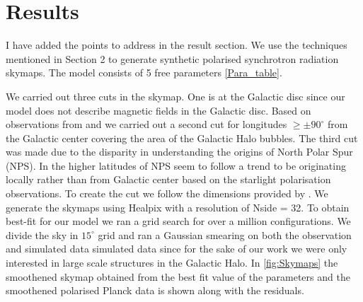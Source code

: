 \documentclass[12pt, a4 paper]{article}
\newcommand{\Vasu}[1]{{\color{purple}#1}}
\begin{document}
\clearpage
\newpage
\section{Results}

\Vasu{I have added the points to address in the result section.}
We use the techniques mentioned in Section 2 to generate synthetic polarised synchrotron radiation skymaps. The model consists of 5 free parameters \ref{Para_table}. 

We carried out three cuts in the skymap. One is at the Galactic disc since our model does not describe magnetic fields in the Galactic disc. Based on observations from \cite{eROSITA} and \cite{Su_2010} we carried out a second cut for longitudes  $\geq \pm 90^{\circ}$ from the Galactic center covering the area of the Galactic Halo bubbles.
The third cut was made due to the disparity in understanding the origins of North Polar Spur (NPS). In \cite{Gina_2021} the higher latitudes of NPS seem to follow a trend to be originating locally rather than from Galactic center based on the starlight polarisation observations. To create the cut we follow the dimensions provided by \cite{Wolleben_2007}.
We generate the skymaps using Healpix with a resolution of Nside = 32. To obtain best-fit for our model we ran a grid search for over a million configurations. We divide the sky in $15^{\circ}$ grid and ran a Gaussian smearing on both the observation and simulated data simulated data since for the sake of our work we were only interested in large scale structures in the Galactic Halo. 
In \ref{fig:Skymaps} the smoothened skymap obtained from the best fit value of the parameters and the smoothened polarised Planck data is shown along with the residuals. 
\end{document}
